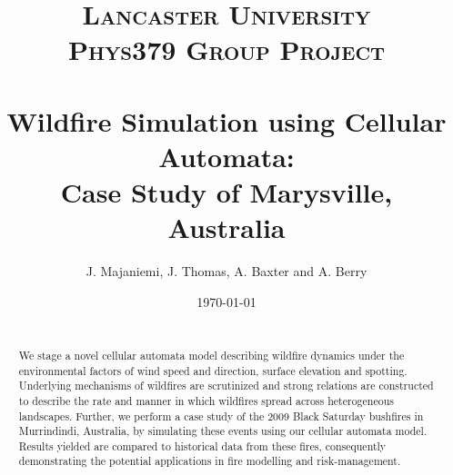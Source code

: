 \documentclass[paper=a4, fontsize=11pt]{scrartcl} %
\title{	
\normalfont \normalsize 
\Large{\textsc{Lancaster University}} \\ [20pt]
\normalsize{\textsc{Phys379 Group Project}} \\ [15pt]
\horrule{0.5pt} \\[0.4cm] %
\huge  Wildfire Simulation using Cellular Automata: \\ Case  Study of Marysville, Australia
\horrule{2pt} \\[0.5cm] %
}
\author{J. Majaniemi, J. Thomas, A. Baxter and A. Berry}
\date{\normalsize\today}
\numberwithin{equation}{section} %
\numberwithin{figure}{section} %
\numberwithin{table}{section} %
\begin{document}
\maketitle

\begin{abstract}

{ }\\
 
We stage a novel cellular automata model describing wildfire dynamics under the environmental factors of wind speed and direction, surface elevation and spotting. Underlying mechanisms of wildfires are scrutinized and strong relations are constructed to describe the rate and manner in which wildfires spread across heterogeneous landscapes. Further, we perform a case study of the 2009 Black Saturday bushfires in Murrindindi, Australia, by simulating these events using our cellular automata model. Results yielded are compared to historical data from these fires, consequently demonstrating the potential applications in fire modelling and risk-management.

\end{abstract}

\newpage
\tableofcontents


















\newpage



\end{document}
